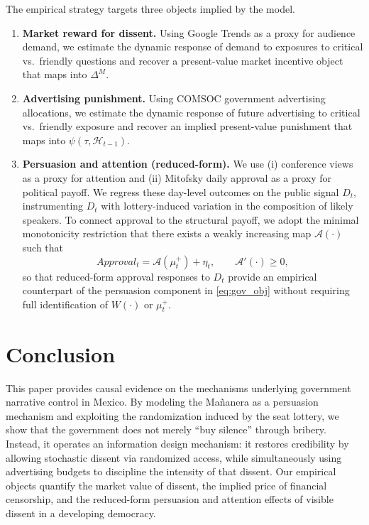 \documentclass[12pt]{article}
\begin{document}
The empirical strategy targets three objects implied by the model.

\begin{enumerate}[leftmargin=1.2em]
\item \textbf{Market reward for dissent.} Using Google Trends as a proxy for audience demand, we estimate the dynamic response of demand to exposures to critical vs.\ friendly questions and recover a present-value market incentive object that maps into $\Delta^M$.

\item \textbf{Advertising punishment.} Using COMSOC government advertising allocations, we estimate the dynamic response of future advertising to critical vs.\ friendly exposure and recover an implied present-value punishment that maps into $\psi(\tau,\mathcal{H}_{t-1})$.

\item \textbf{Persuasion and attention (reduced-form).} We use (i) conference views as a proxy for attention and (ii) Mitofsky daily approval as a proxy for political payoff. We regress these day-level outcomes on the public signal $D_t$, instrumenting $D_t$ with lottery-induced variation in the composition of likely speakers. To connect approval to the structural payoff, we adopt the minimal monotonicity restriction that there exists a weakly increasing map $\mathcal{A}(\cdot)$ such that
\[
Approval_t=\mathcal{A}(\mu_t^+)+\eta_t,\qquad \mathcal{A}'(\cdot)\ge 0,
\]
so that reduced-form approval responses to $D_t$ provide an empirical counterpart of the persuasion component in \eqref{eq:gov_obj} without requiring full identification of $W(\cdot)$ or $\mu_t^+$.
\end{enumerate}


\section{Conclusion}
This paper provides causal evidence on the mechanisms underlying government narrative control in Mexico. By modeling the Mañanera as a persuasion mechanism and exploiting the randomization induced by the seat lottery, we show that the government does not merely ``buy silence'' through bribery. Instead, it operates an information design mechanism: it restores credibility by allowing stochastic dissent via randomized access, while simultaneously using advertising budgets to discipline the intensity of that dissent. Our empirical objects quantify the market value of dissent, the implied price of financial censorship, and the reduced-form persuasion and attention effects of visible dissent in a developing democracy.

\clearpage


\end{document}
